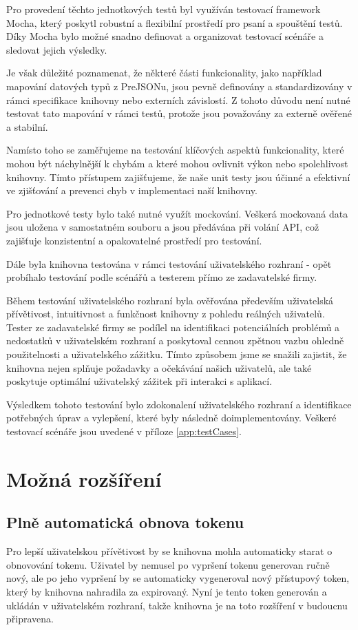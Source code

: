 \documentclass[czech, bc, kiv, he, iso690numb]{fasthesis}
\begin{document}
Pro provedení těchto jednotkových testů byl využíván testovací framework Mocha, který poskytl robustní a flexibilní prostředí pro psaní a spouštění testů. 
Díky Mocha bylo možné snadno definovat a organizovat testovací scénáře a sledovat jejich výsledky.

Je však důležité poznamenat, že některé části funkcionality, jako například mapování datových typů z PreJSONu, jsou pevně definovány a standardizovány v rámci specifikace knihovny nebo externích závislostí. 
Z tohoto důvodu není nutné testovat tato mapování v rámci testů, protože jsou považovány za externě ověřené a stabilní.

Namísto toho se zaměřujeme na testování klíčových aspektů funkcionality, které mohou být náchylnější k chybám a které mohou ovlivnit výkon nebo spolehlivost knihovny. 
Tímto přístupem zajišťujeme, že naše unit testy jsou účinné a efektivní ve zjišťování a prevenci chyb v implementaci naší knihovny.

Pro jednotkové testy bylo také nutné využít mockování. Veškerá mockovaná data jsou uložena v samostatném souboru a jsou předávána při volání API, 
což zajišťuje konzistentní a opakovatelné prostředí pro testování.

Dále byla knihovna testována v rámci testování uživatelského rozhraní - opět probíhalo testování podle scénářů a testerem přímo ze zadavatelské firmy.

Během testování uživatelského rozhraní byla ověřována především uživatelská přívětivost, intuitivnost a funkčnost knihovny z pohledu reálných uživatelů. 
Tester ze zadavatelské firmy se podílel na identifikaci potenciálních problémů a nedostatků v uživatelském rozhraní a poskytoval cennou zpětnou vazbu ohledně použitelnosti a uživatelského zážitku.
Tímto způsobem jsme se snažili zajistit, že knihovna nejen splňuje požadavky a očekávání našich uživatelů, ale také poskytuje optimální uživatelský zážitek při interakci s aplikací.

Výsledkem tohoto testování bylo zdokonalení uživatelského rozhraní a identifikace potřebných úprav a vylepšení, které byly následně doimplementovány. Veškeré testovací scénáře
jsou uvedené v příloze \ref{app:testCases}.

\section{Možná rozšíření}
\subsection{Plně automatická obnova tokenu}
Pro lepší uživatelskou přívětivost by se knihovna mohla automaticky starat o obnovování tokenu. Uživatel by nemusel po vypršení tokenu generovan ručně nový, ale
po jeho vypršení by se automaticky vygeneroval nový přístupový token, který by knihovna nahradila za expirovaný.
Nyní je tento token generován a ukládán v uživatelském rozhraní, takže knihovna je na toto rozšíření v budoucnu připravena.
\end{document}
